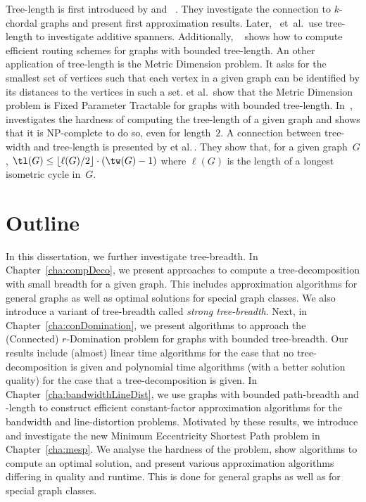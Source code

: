 Tree-length is first introduced by  and ~\cite{DourisGavoil2007}.
They investigate the connection to $k$-chordal graphs and present first approximation results.
Later, ~et~al.\,\cite{DouDraGavYan2007} use tree-length to investigate additive spanners.
Additionally, ~\cite{Dourisboure2005} shows how to compute efficient routing schemes for graphs with bounded tree-length.
An other application of tree-length is the Metric Dimension problem.
It asks for the smallest set of vertices such that each vertex in a given graph can be identified by its distances to the vertices in such a set.
 et al.\,\cite{BelFomGolRam2016} show that the Metric Dimension problem is Fixed Parameter Tractable for graphs with bounded tree-length.
In~\cite{Lokshtanov2010},  investigates the hardness of computing the tree-length of a given graph and shows that it is NP-complete to do so, even for length~$2$.
A connection between tree-width and tree-length is presented by  et al.\,\cite{CoudDucoNiss2016}.
They show that, for a given graph~$G$, $\tl(G) \leq \lfloor \ell(G) / 2 \rfloor \cdot (\tw(G) - 1)$ where $\ell(G)$ is the length of a longest isometric cycle in~$G$.

\section{Outline}

In this dissertation, we further investigate tree-breadth.
In Chapter~\ref{cha:compDeco}, we present approaches to compute a tree-decomposition with small breadth for a given graph.
This includes approximation algorithms for general graphs as well as optimal solutions for special graph classes.
We also introduce a variant of tree-breadth called \emph{strong tree-breadth}.
Next, in Chapter~\ref{cha:conDomination}, we present algorithms to approach the (Connected) $r$-Domination problem for graphs with bounded tree-breadth.
Our results include (almost) linear time algorithms for the case that no tree-decomposition is given and polynomial time algorithms (with a better solution quality) for the case that a tree-decomposition is given.
In Chapter~\ref{cha:bandwidthLineDist}, we use graphs with bounded path-breadth and -length to construct efficient constant-factor approximation algorithms for the bandwidth and line-distortion problems.
Motivated by these results, we introduce and investigate the new Minimum Eccentricity Shortest Path problem in Chapter~\ref{cha:mesp}.
We analyse the hardness of the problem, show algorithms to compute an optimal solution, and present various approximation algorithms differing in quality and runtime.
This is done for general graphs as well as for special graph classes.


